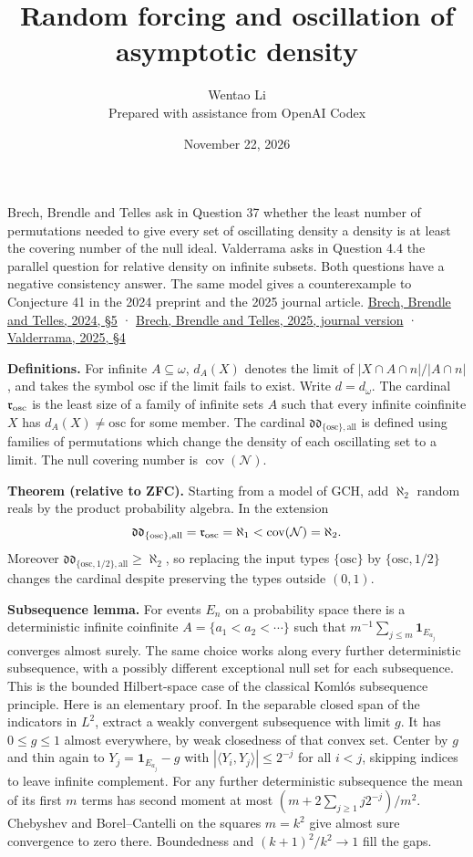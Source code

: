 \documentclass[11pt]{article}
\author{Wentao Li\\\small Prepared with assistance from OpenAI Codex}
\date{November 22, 2026}
\title{Random forcing and oscillation of asymptotic density}
\begin{document}
\maketitle
Brech, Brendle and Telles ask in Question 37 whether the least number of permutations needed to give every set of oscillating density a density is at least the covering number of the null ideal. Valderrama asks in Question 4.4 the parallel question for relative density on infinite subsets. Both questions have a negative consistency answer. The same model gives a counterexample to Conjecture 41 in the 2024 preprint and the 2025 journal article. \href{https://arxiv.org/abs/2410.21102}{Brech, Brendle and Telles, 2024, §5} · \href{https://doi.org/10.1112/jlms.70300}{Brech, Brendle and Telles, 2025, journal version} · \href{https://arxiv.org/abs/2506.21059}{Valderrama, 2025, §4}

\textbf{Definitions.} For infinite \(A\subseteq\omega\), \(d_A(X)\) denotes the limit of \(|X\cap A\cap n|/|A\cap n|\), and takes the symbol \(\mathrm{osc}\) if the limit fails to exist. Write \(d=d_\omega\). The cardinal \(\mathfrak r_{\rm osc}\) is the least size of a family of infinite sets \(A\) such that every infinite coinfinite \(X\) has \(d_A(X)\ne\mathrm{osc}\) for some member. The cardinal \(\mathfrak{dd}_{\{\mathrm{osc}\},\mathrm{all}}\) is defined using families of permutations which change the density of each oscillating set to a limit. The null covering number is \(\operatorname{cov}(\mathcal N)\).

\textbf{Theorem (relative to ZFC).} Starting from a model of GCH, add \(\aleph_2\) random reals by the product probability algebra. In the extension \[
\mathfrak{dd}_{\{\mathrm{osc}\},\mathrm{all}}=\mathfrak r_{\rm osc}=\aleph_1
<\operatorname{cov}(\mathcal N)=\aleph_2.
\] Moreover \(\mathfrak{dd}_{\{\mathrm{osc},1/2\},\mathrm{all}}\geq\aleph_2\), so replacing the input types \(\{\mathrm{osc}\}\) by \(\{\mathrm{osc},1/2\}\) changes the cardinal despite preserving the types outside \((0,1)\).

\textbf{Subsequence lemma.} For events \(E_n\) on a probability space there is a deterministic infinite coinfinite \(A=\{a_1<a_2<\cdots\}\) such that \(m^{-1}\sum_{j\le m}\mathbf1_{E_{a_j}}\) converges almost surely. The same choice works along every further deterministic subsequence, with a possibly different exceptional null set for each subsequence. This is the bounded Hilbert-space case of the classical Komlós subsequence principle. Here is an elementary proof. In the separable closed span of the indicators in \(L^2\), extract a weakly convergent subsequence with limit \(g\). It has \(0\le g\le1\) almost everywhere, by weak closedness of that convex set. Center by \(g\) and thin again to \(Y_j=\mathbf1_{E_{a_j}}-g\) with \(|\langle Y_i,Y_j\rangle|\le2^{-j}\) for all \(i<j\), skipping indices to leave infinite complement. For any further deterministic subsequence the mean of its first \(m\) terms has second moment at most \((m+2\sum_{j\ge1}j2^{-j})/m^2\). Chebyshev and Borel--Cantelli on the squares \(m=k^2\) give almost sure convergence to zero there. Boundedness and \((k+1)^2/k^2\to1\) fill the gaps.
\end{document}
